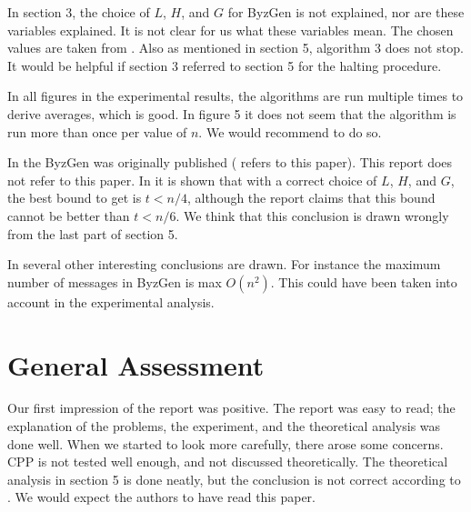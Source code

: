 \documentclass[nocopyrightspace]{acm_proc_article-sp}
\begin{document}
In section 3, the choice of $L$, $H$, and $G$ for ByzGen is not explained, nor are these variables explained. It is not clear for us what these variables mean. The chosen values are taken from \cite{motwani2010randomized}. Also as mentioned in section 5, algorithm 3 does not stop. It would be helpful if section 3 referred to section 5 for the halting procedure.

In all figures in the experimental results, the algorithms are run multiple times to derive averages, which is good. In figure 5 it does not seem that the algorithm is run more than once per value of $n$. We would recommend to do so.

In \cite{rabin1983randomized} the ByzGen was originally published (\cite{motwani2010randomized} refers to this paper). This report does not refer to this paper. In \cite{rabin1983randomized} it is shown that with a correct choice of $L$, $H$, and $G$, the best bound to get is $t < n/4$, although the report claims that this bound cannot be better than $t < n/6$. We think that this conclusion is drawn wrongly from the last part of section 5. 

In \cite{rabin1983randomized} several other interesting conclusions are drawn. For instance the maximum number of messages in ByzGen is max $O(n^2)$. This could have been taken into account in the experimental analysis.

\section{General Assessment}
Our first impression of the report was positive. The report was easy to read; the explanation of the problems, the experiment, and the theoretical analysis was done well. When we started to look more carefully, there arose some concerns. CPP is not tested well enough, and not discussed theoretically. The theoretical analysis in section 5 is done neatly, but the conclusion is not correct according to \cite{rabin1983randomized}. We would expect the authors to have read this paper.

\balancecolumns
\end{document}
